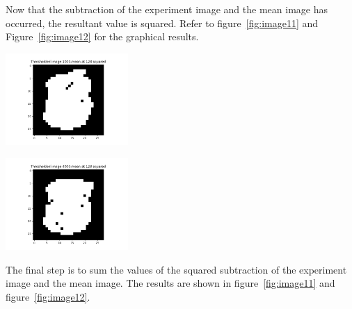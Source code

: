 Now that the subtraction of the experiment image and the mean image has occurred, the resultant value is squared. Refer to figure~\ref{fig:image11} and Figure~\ref{fig:image12} for the graphical results.

\begin{center}
\includegraphics[width=0.35\textwidth]{image11.png}
\end{center}

\begin{center}
\includegraphics[width=0.35\textwidth]{image12.png}
\end{center}

The final step is to sum the values of the squared subtraction of the experiment image and the mean image. The results are shown in figure~\ref{fig:image11} and figure~\ref{fig:image12}.
